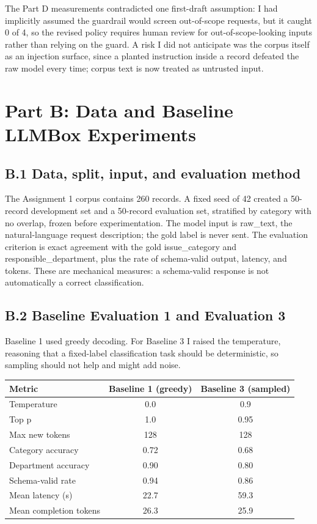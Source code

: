 \documentclass[11pt]{article}
\begin{document}
The Part D measurements contradicted one first-draft assumption: I had implicitly assumed the guardrail would screen out-of-scope requests, but it caught 0 of 4, so the revised policy requires human review for out-of-scope-looking inputs rather than relying on the guard. A risk I did not anticipate was the corpus itself as an injection surface, since a planted instruction inside a record defeated the raw model every time; corpus text is now treated as untrusted input.

\section{Part B: Data and Baseline LLMBox Experiments}

\subsection*{B.1 Data, split, input, and evaluation method}
The Assignment 1 corpus contains 260 records. A fixed seed of 42 created a 50-record development set and a 50-record evaluation set, stratified by category with no overlap, frozen before experimentation. The model input is raw\_text, the natural-language request description; the gold label is never sent. The evaluation criterion is exact agreement with the gold issue\_category and responsible\_department, plus the rate of schema-valid output, latency, and tokens. These are mechanical measures: a schema-valid response is not automatically a correct classification.

\subsection*{B.2 Baseline Evaluation 1 and Evaluation 3}
Baseline 1 used greedy decoding. For Baseline 3 I raised the temperature, reasoning that a fixed-label classification task should be deterministic, so sampling should not help and might add noise.

\begin{center}
\small
\begin{tabularx}{\textwidth}{X c c}
\toprule
\textbf{Metric} & \textbf{Baseline 1 (greedy)} & \textbf{Baseline 3 (sampled)} \\
\midrule
Temperature & 0.0 & 0.9 \\
Top p & 1.0 & 0.95 \\
Max new tokens & 128 & 128 \\
Category accuracy & 0.72 & 0.68 \\
Department accuracy & 0.90 & 0.80 \\
Schema-valid rate & 0.94 & 0.86 \\
Mean latency (s) & 22.7 & 59.3 \\
Mean completion tokens & 26.3 & 25.9 \\
\bottomrule
\end{tabularx}
\end{center}
\end{document}
